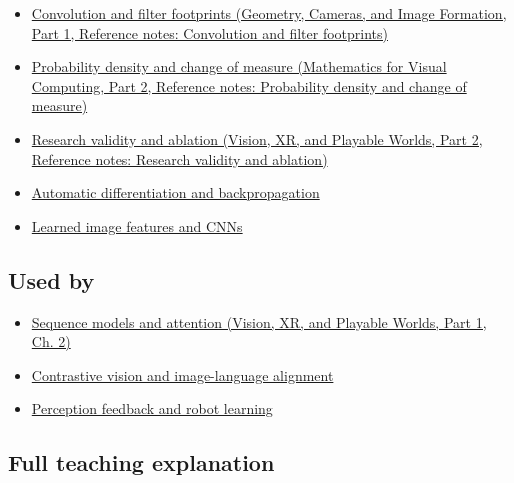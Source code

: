 \hypertarget{appendix-a9d5dfdd164a-prerequisites}{}

\begin{itemize}
\tightlist
\item
  \href{../03-Geometry-Cameras-and-Image-Formation-P01/main.pdf\#nameddest=appendix-d5b3c692d9f0}{Convolution and filter footprints (Geometry, Cameras, and Image Formation, Part 1, Reference notes: Convolution and filter footprints)}
\item
  \href{../02-Mathematics-for-Visual-Computing-P02/main.pdf\#nameddest=appendix-4815cd87ab8b}{Probability density and change of measure (Mathematics for Visual Computing, Part 2, Reference notes: Probability density and change of measure)}
\item
  \href{../07-Vision-XR-and-Playable-Worlds-P02/main.pdf\#nameddest=appendix-65788587ef78}{Research validity and ablation (Vision, XR, and Playable Worlds, Part 2, Reference notes: Research validity and ablation)}
\item
  \hyperref[appendix-40df0855b4a7]{Automatic differentiation and backpropagation}
\item
  \hyperref[appendix-47c51ea026fb]{Learned image features and CNNs}
\end{itemize}

\subsection{Used by}\label{appendix-a9d5dfdd164a-used-by}

\hypertarget{appendix-a9d5dfdd164a-used-by}{}

\begin{itemize}
\tightlist
\item
  \href{../07-Vision-XR-and-Playable-Worlds-P01/main.pdf\#nameddest=04-visual-computing-ii-ch031-sequence-models-and-attention}{Sequence models and attention (Vision, XR, and Playable Worlds, Part 1, Ch. 2)}
\item
  \hyperref[appendix-772f1fd96148]{Contrastive vision and image-language alignment}
\item
  \hyperref[appendix-b0c42da325f1]{Perception feedback and robot learning}
\end{itemize}

\subsection{Full teaching explanation}\label{appendix-a9d5dfdd164a-full-teaching-explanation}

